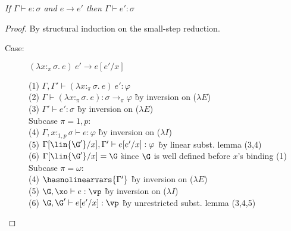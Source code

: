 
\begin{theorem}
\emph{If $\Gamma \vdash e : \sigma$ and $e \longrightarrow e'$ then $\Gamma \vdash e' : \sigma$}
\end{theorem}

\begin{proof}
By structural induction on the small-step reduction.

%

\begin{description}

\item[Case:] $(\lambda x{:}_\pi\sigma.~e)~e' \longrightarrow e[e'/x]$
\begin{tabbing}
    (1) $\Gamma, \Gamma' \vdash (\lambda x{:}_\pi\sigma.~e)~e' : \varphi$\\
    (2) $\Gamma \vdash (\lambda x{:}_\pi\sigma.~e) : \sigma\to_\pi\varphi$ \` by inversion on ($\lambda E$) \\
    (3) $\Gamma' \vdash e' : \sigma$ \` by inversion on ($\lambda E$) \\
    Subcase $\pi = 1,p$:\\
    (4) $\Gamma, x{:}_{1,p}\sigma \vdash e : \varphi$ \` by inversion on ($\lambda I$) \\
    (5) $\Gamma[\lin{\G'}/x], \Gamma' \vdash e[e'/x] : \varphi$ \` by linear subst. lemma (3,4) \\
    (6) $\Gamma[\lin{\G'}/x] = \G$ \` since $\G$ is well defined before $x$'s binding (1)\\
    Subcase $\pi = \omega$:\\
    (4) $\hasnolinearvars{\Gamma'}$ \` by inversion on ($\lambda E$) \\
    (5) $\G, \xo \vdash e : \vp$ \` by inversion on ($\lambda I$)\\
    (6) $\G, \G' \vdash e[e'/x] : \vp$ \` by unrestricted subst. lemma (3,4,5)\\
\end{tabbing}


\end{description}
\end{proof}

